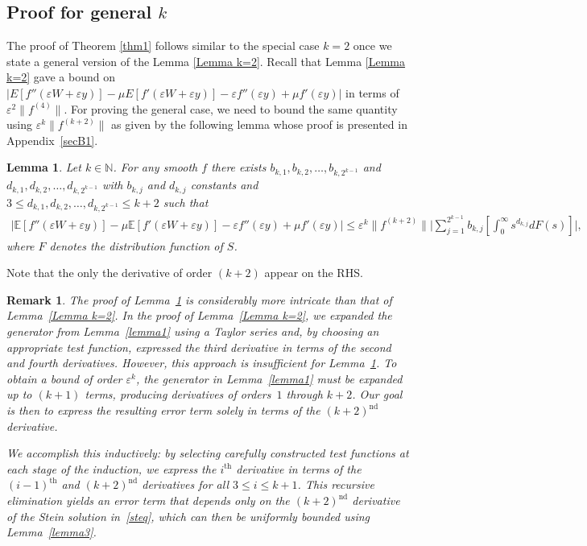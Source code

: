 \documentclass[11pt,letterpaper,reqno]{article}
\theoremstyle{thmstyleone}%
\theoremstyle{thmstyletwo}%
\newtheorem{remark}{Remark}%
\newtheorem{lemma}{Lemma}
\theoremstyle{thmstylethree}%
\numberwithin{equation}{section}
\begin{document}
\subsection{Proof for general $k$}\label{sec general k}

The proof of Theorem \ref{thm1} follows similar to the %
special case $k=2$ once we state a general version of the Lemma \ref{Lemma k=2}. Recall that Lemma \ref{Lemma k=2} gave a bound on $ \bigg|E[f''(\varepsilon W+\varepsilon y)]-\mu E[f'(\varepsilon W+\varepsilon y)]-\varepsilon f''(\varepsilon y)
     +\mu f'(\varepsilon y)\bigg|$ in terms of $\varepsilon^2\|f^{(4)}\| $. For proving the general case, %
     we need to bound the same quantity using $\varepsilon^k \|f^{(k+2)}\| $ as given by the following lemma whose proof is presented in Appendix~\ref{secB1}.
\begin{lemma}\label{lemma general k}
    Let $k \in \mathbb N$. For any smooth $f$ there exists $b_{k,1},b_{k,2}, \ldots, b_{k,2^{k-1}}$ and $d_{k,1},d_{k,2}, \ldots, d_{k,2^{k-1}}$ with $b_{k,j}$ and $d_{k,j}$ constants and $3 \leq d_{k,1},d_{k,2}, \ldots, d_{k,2^{k-1}} \leq k+2$ such that 
    \begin{align*}
        \bigg|\mathbb E[f''(\varepsilon W+\varepsilon y)]-\mu \mathbb E[f'(\varepsilon W+\varepsilon y)]-\varepsilon f''(\varepsilon y)
     +\mu f'(\varepsilon y)\bigg|\leq \varepsilon^k \|f^{(k+2)}\| \bigg|\sum_{j=1}^{2^{k-1}}b_{k,j}  \left[ \int_0^\infty s^{d_{k,j}}dF(s)\right]\bigg|,
    \end{align*}
where $F$ denotes the distribution function of $S$.
\end{lemma}
Note that the only the derivative of order $(k+2)$ appear on the RHS. %
\begin{remark}\label{rem:induction}
The proof of Lemma~\ref{lemma general k} is considerably more intricate than that of Lemma~\ref{Lemma k=2}. In the proof of Lemma~\ref{Lemma k=2}, we expanded the generator from Lemma~\ref{lemma1} using a Taylor series and, by choosing an appropriate test function, expressed the third derivative in terms of the second and fourth derivatives. However, this approach is insufficient %
for Lemma~\ref{lemma general k}. To obtain a bound of order $\varepsilon^k$, the generator in Lemma~\ref{lemma1} must be expanded up to $(k+1)$ terms, producing derivatives of orders~$1$ through $k+2$. Our goal is then to express the resulting error term solely in terms of the $(k+2)^{\text{nd}}$ derivative.

We accomplish this inductively: by selecting carefully constructed test functions at each stage of the induction, we express the $i^{\text{th}}$ derivative in terms of the $(i-1)^{\text{th}}$ and $(k+2)^{\text{nd}}$ derivatives for all $3 \leq i \leq k+1$. This recursive elimination yields an error term that depends only on the $(k+2)^{\text{nd}}$ derivative of the Stein solution in~\eqref{steq}, which can then be uniformly bounded using Lemma~\ref{lemma3}.   
\end{remark}
\end{document}
